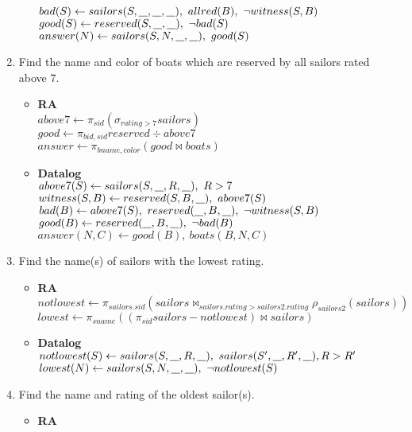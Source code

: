 \documentclass{article}
\newcommand{\anyvar}{\underline{\hspace{0.8em}}}
\newcommand{\RA}{\textbf{RA}}
\newcommand{\DL}{\textbf{Datalog}}
\begin{document}
\begin{enumerate}
\begin{itemize}
	$ bad(S) \gets sailors(S, \anyvar, \anyvar, \anyvar),\ allred(B),\ \neg witness(S, B) $ \\
	$ good(S) \gets reserved(S, \anyvar, \anyvar),\ \neg bad(S) $ \\
	$ answer(N) \gets sailors(S, N, \anyvar, \anyvar),\ good(S) $
	\end{itemize}
\item Find the name and color of boats which are reserved by all sailors rated above 7.
	\begin{itemize}
	\item \RA \\
	$ above7 \gets \pi_{sid}(\sigma_{rating > 7} sailors) $ \\
	$ good \gets \pi_{bid,sid}reserved \div above7$ \\
	$ answer \gets \pi_{bname, color}(good \bowtie boats)$
	\item \DL \\
	$ above7(S) \gets sailors(S, \anyvar, R, \anyvar), \ R > 7$ \\
	$ witness(S, B) \gets reserved(S, B, \anyvar),\ above7(S) $ \\
	$ bad(B) \gets above7(S),\ reserved(\anyvar, B, \anyvar),\ \neg witness(S, B) $ \\
	$ good(B) \gets reserved(\anyvar, B, \anyvar),\ \neg bad(B) $ \\
	$ answer(N, C) \gets good(B),\ boats(B, N, C) $
	\end{itemize}
\item Find the name(s) of sailors with the lowest rating.
	\begin{itemize}
	\item \RA \\
	$ notlowest \gets \pi_{sailors.sid}(sailors \bowtie_{sailors.rating > sailors2.rating} \rho_{sailors2} (sailors)) $ \\
	$ lowest \gets \pi_{sname}((\pi_{sid}sailors - notlowest) \bowtie sailors) $
	\item \DL \\
	$ notlowest(S) \gets sailors(S, \anyvar, R, \anyvar), \ sailors(S', \anyvar, R', \anyvar), R > R' $ \\
	$ lowest(N) \gets sailors(S, N, \anyvar, \anyvar), \ \neg notlowest(S) $
	\end{itemize}
\item Find the name and rating of the oldest sailor(s).
	\begin{itemize}
	\item \RA \\

\end{itemize}
\end{enumerate}
\end{document}

